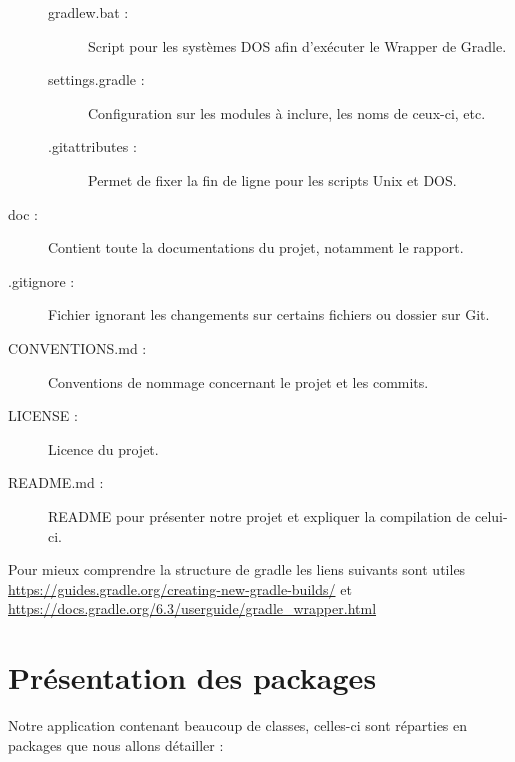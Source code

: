 \begin{description}
\begin{description}
				\item[gradlew.bat :]{Script pour les systèmes DOS afin d'exécuter le Wrapper de Gradle.}
				\item[settings.gradle :]{Configuration sur les modules à inclure, les noms de ceux-ci, etc.}
				\item[.gitattributes :]{Permet de fixer la fin de ligne pour les scripts Unix et DOS.}
			\end{description}
			\item[doc :]{Contient toute la documentations du projet, notamment le rapport.}
			\item[.gitignore :]{Fichier ignorant les changements sur certains fichiers ou dossier sur Git.}
			\item[CONVENTIONS.md :]{Conventions de nommage concernant le projet et les commits.}
			\item[LICENSE :]{Licence du projet.}
			\item[README.md :]{README pour présenter notre projet et expliquer la compilation de celui-ci.}
		\end{description}

		Pour mieux comprendre la structure de gradle les liens suivants sont utiles \url{https://guides.gradle.org/creating-new-gradle-builds/} et \url{https://docs.gradle.org/6.3/userguide/gradle_wrapper.html}

	\section{Présentation des packages}

		Notre application contenant beaucoup de classes, celles-ci sont réparties en packages que nous allons détailler :


